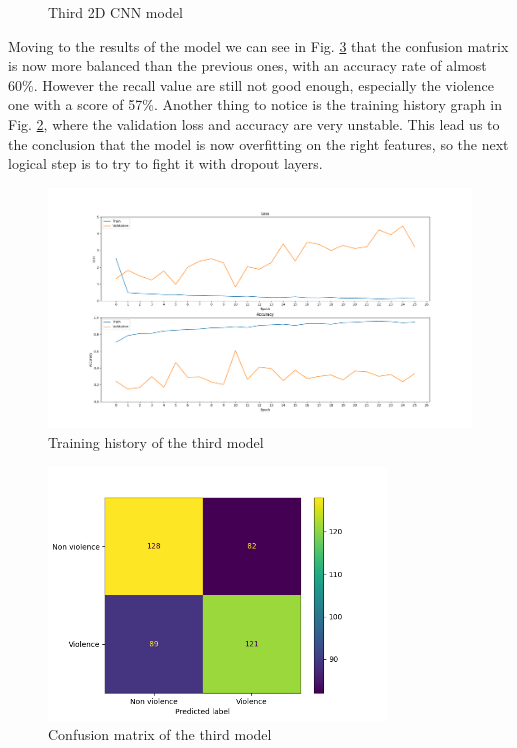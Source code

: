 \begin{figure}[]
    \caption{Third 2D CNN model}
    \label{fig:Third2DCNN}
\end{figure}

Moving to the results of the model we can see in Fig. \ref{fig:Third2DCNNMatrix} that the confusion matrix is now more balanced than the previous ones, with an accuracy rate of almost 60\%. However the recall value are still not good enough, especially the violence one with a score of 57\%. Another thing to notice is the training history graph in Fig. \ref{fig:Third2DCNNHistory}, where the validation loss and accuracy are very unstable. This lead us to the conclusion that the model is now overfitting on the right features, so the next logical step is to try to fight it with dropout layers.
\begin{figure}[]
    \centering
    \includegraphics[width=1\textwidth]{images/731a-simple3augConv8_64Dense128_64nozoom-b538-history.png}
    \caption{Training history of the third model}
    \label{fig:Third2DCNNHistory}
\end{figure}
\begin{figure}[]
    \centering
    \includegraphics[width=0.8\textwidth]{images/731a-simple3augConv8_64Dense128_64nozoom-b538-conf_matrix.png}
    \caption{Confusion matrix of the third model}
    \label{fig:Third2DCNNMatrix}
\end{figure}
\pagebreak
